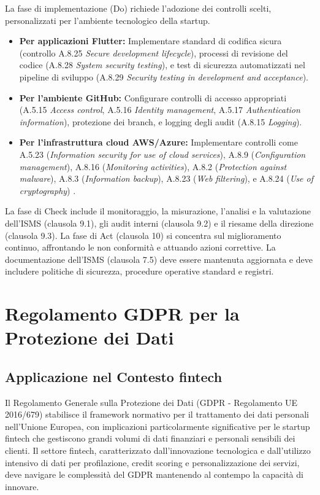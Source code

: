 La fase di implementazione (Do) richiede l'adozione dei controlli scelti, personalizzati per l'ambiente tecnologico della startup.
\begin{itemize}
    \item \textbf{Per applicazioni Flutter:} Implementare standard di codifica sicura (controllo A.8.25 \textit{Secure development lifecycle}), processi di revisione del codice (A.8.28 \textit{System security testing}), e test di sicurezza automatizzati nel pipeline di sviluppo (A.8.29 \textit{Security testing in development and acceptance}).
    \item \textbf{Per l'ambiente GitHub:} Configurare controlli di accesso appropriati (A.5.15 \textit{Access control}, A.5.16 \textit{Identity management}, A.5.17 \textit{Authentication information}), protezione dei branch, e logging degli audit (A.8.15 \textit{Logging}).
    \item \textbf{Per l'infrastruttura cloud AWS/Azure:} Implementare controlli come A.5.23 (\textit{Information security for use of cloud services}), A.8.9 (\textit{Configuration management}), A.8.16 (\textit{Monitoring activities}), A.8.2 (\textit{Protection against malware}), A.8.3 (\textit{Information backup}), A.8.23 (\textit{Web filtering}), e A.8.24 (\textit{Use of cryptography}) .
\end{itemize}
La fase di Check include il monitoraggio, la misurazione, l'analisi e la valutazione dell'ISMS (clausola 9.1), gli audit interni (clausola 9.2) e il riesame della direzione (clausola 9.3). La fase di Act (clausola 10) si concentra sul miglioramento continuo, affrontando le non conformità e attuando azioni correttive. La documentazione dell'ISMS (clausola 7.5) deve essere mantenuta aggiornata e deve includere politiche di sicurezza, procedure operative standard e registri.

\section{Regolamento GDPR per la Protezione dei Dati}
\label{sec:gdpr}

\subsection{Applicazione nel Contesto fintech}
Il Regolamento Generale sulla Protezione dei Dati (GDPR - Regolamento UE 2016/679) stabilisce il framework normativo per il trattamento dei dati personali nell'Unione Europea, con implicazioni particolarmente significative per le startup fintech che gestiscono grandi volumi di dati finanziari e personali sensibili dei clienti. Il settore fintech, caratterizzato dall'innovazione tecnologica e dall'utilizzo intensivo di dati per profilazione, credit scoring e personalizzazione dei servizi, deve navigare le complessità del GDPR mantenendo al contempo la capacità di innovare.


